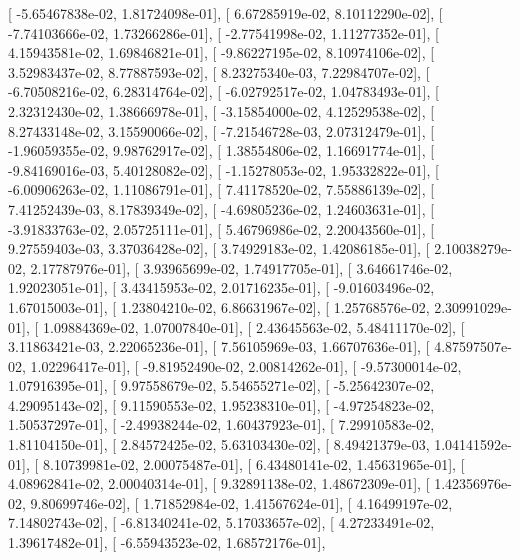 \documentclass{article}
\begin{document}
       [ -5.65467838e-02,   1.81724098e-01],
       [  6.67285919e-02,   8.10112290e-02],
       [ -7.74103666e-02,   1.73266286e-01],
       [ -2.77541998e-02,   1.11277352e-01],
       [  4.15943581e-02,   1.69846821e-01],
       [ -9.86227195e-02,   8.10974106e-02],
       [  3.52983437e-02,   8.77887593e-02],
       [  8.23275340e-03,   7.22984707e-02],
       [ -6.70508216e-02,   6.28314764e-02],
       [ -6.02792517e-02,   1.04783493e-01],
       [  2.32312430e-02,   1.38666978e-01],
       [ -3.15854000e-02,   4.12529538e-02],
       [  8.27433148e-02,   3.15590066e-02],
       [ -7.21546728e-03,   2.07312479e-01],
       [ -1.96059355e-02,   9.98762917e-02],
       [  1.38554806e-02,   1.16691774e-01],
       [ -9.84169016e-03,   5.40128082e-02],
       [ -1.15278053e-02,   1.95332822e-01],
       [ -6.00906263e-02,   1.11086791e-01],
       [  7.41178520e-02,   7.55886139e-02],
       [  7.41252439e-03,   8.17839349e-02],
       [ -4.69805236e-02,   1.24603631e-01],
       [ -3.91833763e-02,   2.05725111e-01],
       [  5.46796986e-02,   2.20043560e-01],
       [  9.27559403e-03,   3.37036428e-02],
       [  3.74929183e-02,   1.42086185e-01],
       [  2.10038279e-02,   2.17787976e-01],
       [  3.93965699e-02,   1.74917705e-01],
       [  3.64661746e-02,   1.92023051e-01],
       [  3.43415953e-02,   2.01716235e-01],
       [ -9.01603496e-02,   1.67015003e-01],
       [  1.23804210e-02,   6.86631967e-02],
       [  1.25768576e-02,   2.30991029e-01],
       [  1.09884369e-02,   1.07007840e-01],
       [  2.43645563e-02,   5.48411170e-02],
       [  3.11863421e-03,   2.22065236e-01],
       [  7.56105969e-03,   1.66707636e-01],
       [  4.87597507e-02,   1.02296417e-01],
       [ -9.81952490e-02,   2.00814262e-01],
       [ -9.57300014e-02,   1.07916395e-01],
       [  9.97558679e-02,   5.54655271e-02],
       [ -5.25642307e-02,   4.29095143e-02],
       [  9.11590553e-02,   1.95238310e-01],
       [ -4.97254823e-02,   1.50537297e-01],
       [ -2.49938244e-02,   1.60437923e-01],
       [  7.29910583e-02,   1.81104150e-01],
       [  2.84572425e-02,   5.63103430e-02],
       [  8.49421379e-03,   1.04141592e-01],
       [  8.10739981e-02,   2.00075487e-01],
       [  6.43480141e-02,   1.45631965e-01],
       [  4.08962841e-02,   2.00040314e-01],
       [  9.32891138e-02,   1.48672309e-01],
       [  1.42356976e-02,   9.80699746e-02],
       [  1.71852984e-02,   1.41567624e-01],
       [  4.16499197e-02,   7.14802743e-02],
       [ -6.81340241e-02,   5.17033657e-02],
       [  4.27233491e-02,   1.39617482e-01],
       [ -6.55943523e-02,   1.68572176e-01],
\end{document}
